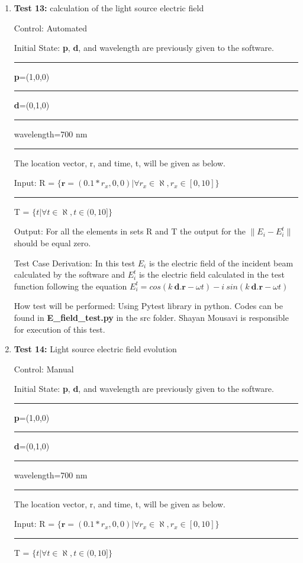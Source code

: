 \documentclass[12pt, titlepage]{article}
\begin{document}
\begin{enumerate}
	
	\item{\textbf{Test 13:} calculation of the light source electric field \\}
	
	Control: Automated 
	
	Initial State:  \textbf{p}, \textbf{d}, and wavelength are previously given to the software. \\
	\rule{2.3cm}{0pt} \textbf{p}=(1,0,0)\\
	\rule{2.3cm}{0pt} \textbf{d}=(0,1,0)\\
	\rule{2.3cm}{0pt} wavelength=700 nm\\
	\rule{2.3cm}{0pt} The location vector, r, and time, t, will be given as below.  
	
	Input: R = $\{\textbf{r}=(0.1*r_x,0,0)| \forall r_x \in \aleph, r_x \in [0,10]\}$\\
	\rule{1.3cm}{0pt}T = $\{t| \forall t \in \aleph, t \in (0,10]\}$
	
	Output: For all the elements in sets R and T the output for the $\|E_i-E_{i}^t\|$ should be equal zero.
	 	
	Test Case Derivation: In this test $E_i$ is the electric field of the incident beam calculated by the software and $E_i^t$ is the electric field calculated in the test function following the equation $E_i^t = cos(k\  \textbf{d.} \textbf{r} - \omega t) - i \ sin(k\  \textbf{d.} \textbf{r} - \omega t)$   
	
	How test will be performed: Using Pytest library in python. Codes can be found in \textbf{E\_field\_test.py } in the src folder. Shayan Mousavi is responsible for execution of this test. 
\\	
\item{\textbf{Test 14:} Light source electric field evolution\\}

Control: Manual 

Initial State:  \textbf{p}, \textbf{d}, and wavelength are previously given to the software. \\
\rule{2.3cm}{0pt} \textbf{p}=(1,0,0)\\
\rule{2.3cm}{0pt} \textbf{d}=(0,1,0)\\
\rule{2.3cm}{0pt} wavelength=700 nm\\
\rule{2.3cm}{0pt} The location vector, r, and time, t, will be given as below.  

Input: R = $\{\textbf{r}=(0.1*r_x,0,0)| \forall r_x \in \aleph, r_x \in [0,10]\}$\\
\rule{1.3cm}{0pt}T = $\{t| \forall t \in \aleph, t \in (0,10]\}$


\end{enumerate}
\end{document}
